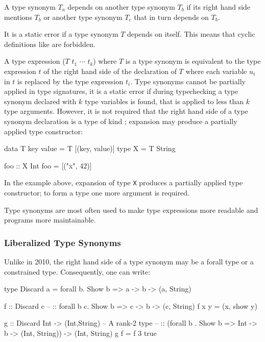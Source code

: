 A type synonym $T_a$ depends on another type synonym $T_b$ if its right hand side mentions $T_b$ or another type synonym $T_c$ that in turn depends on $T_b$.

It is a static error if a type synonym $T$ depends on itself.
This means that cyclic definitions like 
are forbidden.

A type expression ($T$ $t_1$ $\cdots$ $t_k$) where $T$ is a type synonym is equivalent to the type expression $t$ of the right hand side of the declaration of $T$ where each variable $u_i$ in $t$ is replaced by the type expression $t_i$. Type synonyms cannot be partially applied in type signatures, it is a static error if during typechecking a type synonym declared with $k$ type variables is found, that is applied to less than $k$ type arguments. However, it is not required that the right hand side of a type synonym declaration is a type of kind \sym{*}; expansion may produce a partially applied type constructor:

\begin{code}
data T key value = T [(key, value)]
type X = T String

foo :: X Int
foo = [("x", 42)]
\end{code}

In the example above, expansion of type \texttt{X} produces a partially applied type constructor; to form a type one more argument is required.

Type synonyms are most often used to make type expressions more readable and programs more maintainable.

\subsubsection*{Liberalized Type Synonyms}

Unlike in \haskell{} 2010, the right hand side of a type synonym may be a forall type or a constrained type. Consequently, one can write:

\begin{code}
type Discard a = forall b. Show b => a -> b -> (a, String)

f  :: Discard c
-- :: forall b c. Show b => c -> b -> (c, String)
f x y = (x, show y)

g  :: Discard Int -> (Int,String)    -- A rank-2 type
-- :: (forall b . Show b => Int -> b -> (Int, String)) -> (Int, String) 
g f = f 3 true
\end{code}

